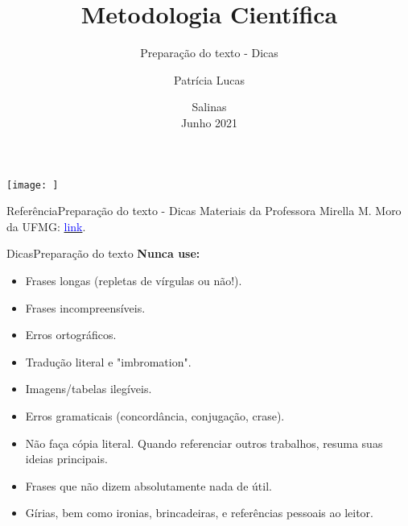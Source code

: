 \documentclass[t]{beamer}
\title[]{Metodologia Científica}
\subtitle[]{Preparação do texto - Dicas}
\author[]{Patrícia Lucas\\{\footnotesize }}
\institute{Bacharelado em Sistemas de Informação \\ IFNMG  - Campus Salinas}
\date{\scriptsize Salinas\\Junho 2021}
\begin{document}
\begin{frame}

\begin{center}
\texttt{[image: ]}
\end{center}
  \titlepage
\end{frame}


\begin{ftst}{Referência}{Preparação do texto - Dicas}
\vone
Materiais da Professora Mirella M. Moro da UFMG: \href{https://homepages.dcc.ufmg.br/~mirella/doku.php.}{\textcolor{blue}{link}}.

\end{ftst}


\begin{ftst}{Dicas}{Preparação do texto}
\justifying
\textbf{Nunca use:}
\vone

\begin{itemize}
    \item Frases longas (repletas de vírgulas ou não!).
    \item Frases incompreensíveis.
    \item Erros ortográficos.
    \item Tradução literal e "imbromation".
    \item Imagens/tabelas ilegíveis.
    \item Erros gramaticais (concordância, conjugação, crase).
    \item Não faça cópia literal. Quando referenciar outros trabalhos, resuma suas ideias principais.
    \item Frases que não dizem absolutamente nada de útil.
    \item Gírias, bem como ironias, brincadeiras, e referências pessoais ao leitor.
\end{itemize}

\end{ftst}
\end{document}
